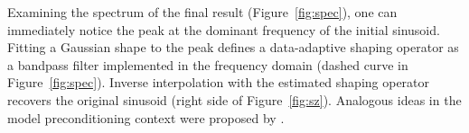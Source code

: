 Examining the spectrum of the final result (Figure~\ref{fig:spec}),
one can immediately notice the peak at the dominant frequency of the
initial sinusoid.  Fitting a Gaussian shape to the peak defines a
data-adaptive shaping operator as a bandpass filter implemented in the
frequency domain (dashed curve in Figure~\ref{fig:spec}). Inverse
interpolation with the estimated shaping operator recovers the
original sinusoid (right side of Figure~\ref{fig:sz}). Analogous
ideas in the model preconditioning context were proposed by 
\cite{SEG-2001-19211924}.


\begin{comment}

\inputdir{rain}

\subsection{2-D data regularization}
The second benchmark was previously used in
\cite[]{Fomel.sepphd.107}. It comes from the test dataset that
contains rainfall measurements in Switzerland on the 8th of May
1986. The dataset appeared in the Spatial Interpolation Comparison
\cite[]{jgida}, which benchmarked several different spatial
interpolation methods. Figure~\ref{fig:elev} shows the data area: the
Digital Elevation Model of Switzerland and the country's
borders\footnote{I provide the elevation image only for reference. It
has not been used in the interpolation experiment.}. A total of 467
rainfall measurements were taken. A subset of randomly selected 100
measurements was used in the 1997 Spatial Interpolation Comparison in
order to compare the results with the known data.
Figure~\ref{fig:raindata} shows the spatial location of the selected
data samples.

\sideplot{elev}{width=\columnwidth}{Switzerland border overlaid on a
digital elevation map.}

\plot{raindata}{width=6.0in}{Left: data locations for all 467
  measurements. Right: data locations for selected 100 measurements.}

Rainfall level is generally a smoothly varying quantity. We cannot
expect it to be represented a priori by a simple function. Therefore,
it is reasonable to take the regularization operator $\mathbf{D}$ to be
a convolution with the Laplacian filter. The
interpolation result using the conventional regularization
scheme~\ref{eqn:minv1} is shown in
Figure~\ref{fig:lapinter}. The input irregular data were regularized
on a 376 by 253 grid, which corresponds to the digital elevation model
in Figure~\ref{fig:elev}. Similarly to what happens in the
one-dimensional synthetic examples, the solution converges steadily
but with a slow spread of information away from the known data points.
It takes about $10,000$ iterations to achieve full convergence.


\end{comment}
